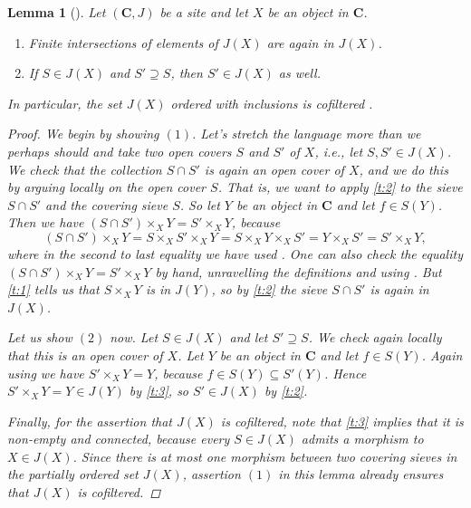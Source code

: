 \documentclass[12pt,reqno,a4paper]{amsart}
\theoremstyle{plain}
\newtheorem{lm}[thm]{Lemma}
\theoremstyle{definition}
\theoremstyle{remark}
\begin{document}
\begin{lm}[{\cite[\href{https://stacks.math.columbia.edu/tag/00Z5}{Tag 00Z5}]{stacks-project}}]\label{lm:cofiltered}
  Let $(\mathbf{C},J)$ be a site and let $X$ be an object in $\mathbf{C}$.
  \begin{enumerate}
    \item Finite intersections of elements of $J(X)$ are again in $J(X)$.
    \item If $S \in J(X)$ and $S' \supseteq S$, then $S' \in J(X)$ as well.
  \end{enumerate}
  In particular, the set $J(X)$ ordered with inclusions is cofiltered \cite[\href{https://stacks.math.columbia.edu/tag/04AZ}{Tag 04AZ}]{stacks-project}.
  \begin{proof}
    We begin by showing $(1)$.
    Let's stretch the language more than we perhaps should and take two open covers $S$ and $S'$ of $X$, i.e., let $S, S' \in J(X)$.
    We check that the collection $S \cap S'$ is again an open cover of $X$, and we do this by arguing locally on the open cover $S$.
    That is, we want to apply \ref{t:2} to the sieve $S \cap S'$ and the covering sieve $S$.
    So let $Y$ be an object in $\mathbf{C}$ and let $f \in S(Y)$.
    Then we have $(S \cap S') \times_{X} Y = S' \times_{X} Y$, because
    \[ (S \cap S') \times_{X} Y = S \times_{X} S' \times_{X} Y = S \times_{X} Y \times_{X} S' = Y \times_{X} S' = S' \times_{X} Y, \]
    where in the second to last equality we have used .
    One can also check the equality $(S \cap S') \times_{X} Y = S' \times_{X} Y$ by hand, unravelling the definitions and using .
    But \ref{t:1} tells us that $S \times_{X} Y$ is in $J(Y)$, so by \ref{t:2} the sieve $S \cap S'$ is again in $J(X)$.

    Let us show $(2)$ now.
    Let $S \in J(X)$ and let $S' \supseteq S$.
    We check again locally that this is an open cover of $X$.
    Let $Y$ be an object in $\mathbf{C}$ and let $f \in S(Y)$.
    Again using  we have $S' \times_{X} Y = Y$, because $f \in S(Y) \subseteq S'(Y)$.
    Hence $S' \times_{X} Y = Y \in J(Y)$ by \ref{t:3}, so $S' \in J(X)$ by \ref{t:2}.

    Finally, for the assertion that $J(X)$ is cofiltered, note that \ref{t:3} implies that it is non-empty and connected, because every $S \in J(X)$ admits a morphism to $X \in J(X)$.
    Since there is at most one morphism between two covering sieves in the partially ordered set $J(X)$, assertion $(1)$ in this lemma already ensures that $J(X)$ is cofiltered.
  \end{proof}
\end{lm}
\end{document}
